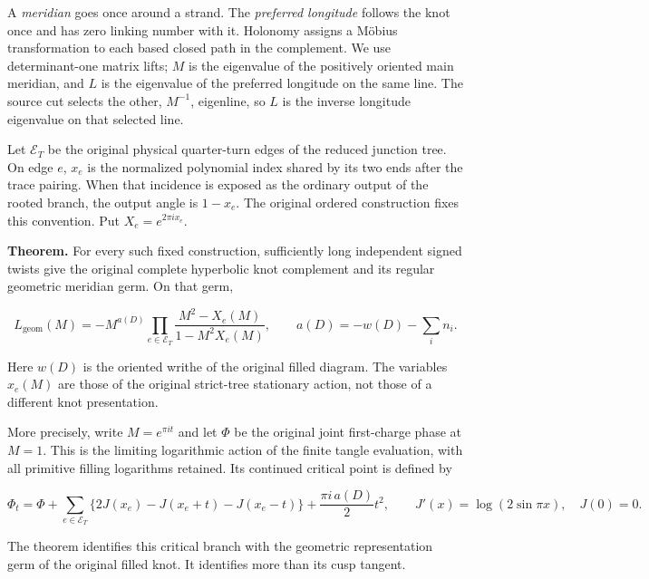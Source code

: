 A \emph{meridian} goes once around a strand. The \emph{preferred longitude}
follows the knot once and has zero linking number with it.
Holonomy assigns a Möbius transformation to each based closed
path in the complement. We use determinant-one matrix lifts;
\(M\) is the eigenvalue of the positively oriented main meridian,
and \(L\) is the eigenvalue of the preferred longitude on the same
line. The source cut selects the other, \(M^{-1}\), eigenline,
so \(L\) is the inverse longitude eigenvalue on that selected line.

Let \(\mathcal E_T\) be the original physical quarter-turn edges
of the reduced junction tree. On edge \(e\), \(x_e\) is the
normalized polynomial index shared by its two ends after the
trace pairing. When that incidence is exposed as the ordinary
output of the rooted branch, the output angle is \(1-x_e\).
The original ordered construction fixes this convention.
Put \(X_e=e^{2\pi ix_e}\).

\textbf{Theorem.} For every such fixed construction, sufficiently long
independent signed twists give the original complete hyperbolic
knot complement and its regular geometric meridian germ.
On that germ,

\begin{equation}\label{gj:T2}
\boxed{\displaystyle
 L_{\mathrm{geom}}(M)
  =-M^{a(D)}
     \prod_{e\in\mathcal E_T}
       \frac{M^2-X_e(M)}{1-M^2X_e(M)},\qquad
                 a(D)=-w(D)-\sum_i n_i.}
\end{equation}

Here \(w(D)\) is the oriented writhe of the original filled
diagram. The variables \(x_e(M)\) are those of the original
strict-tree stationary action, not those of a different knot
presentation.

More precisely, write \(M=e^{\pi it}\) and let \(\Phi\) be the
original joint first-charge phase at \(M=1\). This is the limiting
logarithmic action of the finite tangle evaluation, with all primitive
filling logarithms retained. Its continued critical point is
defined by

\begin{equation}\label{gj:T3}
\Phi_t=\Phi+
   \sum_{e\in\mathcal E_T}
      \{2J(x_e)-J(x_e+t)-J(x_e-t)\}
                  +\frac{\pi i\,a(D)}2t^2,
 \qquad J'(x)=\log(2\sin\pi x),\quad J(0)=0.
\end{equation}

The theorem identifies this critical branch with the geometric
representation germ of the original filled knot. It identifies
more than its cusp tangent.


